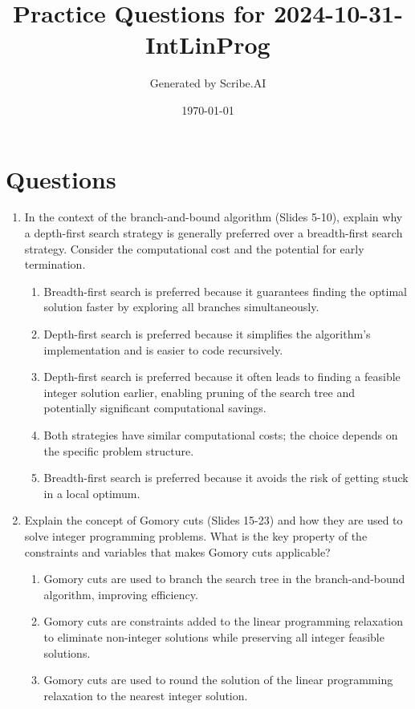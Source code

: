 \documentclass{article}%
\title{Practice Questions for 2024{-}10{-}31{-}IntLinProg}%
\author{Generated by Scribe.AI}%
\date{\today}%
\begin{document}
%
\normalsize%
\maketitle%
\section{Questions}%
\label{sec:Questions}%
\begin{enumerate}%
\item In the context of the branch-and-bound algorithm (Slides 5-10), explain why a depth-first search strategy is generally preferred over a breadth-first search strategy.  Consider the computational cost and the potential for early termination.%
\begin{enumerate}%
\item Breadth-first search is preferred because it guarantees finding the optimal solution faster by exploring all branches simultaneously.%
\item Depth-first search is preferred because it simplifies the algorithm's implementation and is easier to code recursively.%
\item Depth-first search is preferred because it often leads to finding a feasible integer solution earlier, enabling pruning of the search tree and potentially significant computational savings.%
\item Both strategies have similar computational costs; the choice depends on the specific problem structure.%
\item Breadth-first search is preferred because it avoids the risk of getting stuck in a local optimum.%
\end{enumerate}%
\vspace{1em}%
\item Explain the concept of Gomory cuts (Slides 15-23) and how they are used to solve integer programming problems.  What is the key property of the constraints and variables that makes Gomory cuts applicable?%
\begin{enumerate}%
\item Gomory cuts are used to branch the search tree in the branch-and-bound algorithm, improving efficiency.%
\item Gomory cuts are constraints added to the linear programming relaxation to eliminate non-integer solutions while preserving all integer feasible solutions.%
\item Gomory cuts are used to round the solution of the linear programming relaxation to the nearest integer solution.%

\end{enumerate}
\end{enumerate}
\end{document}

